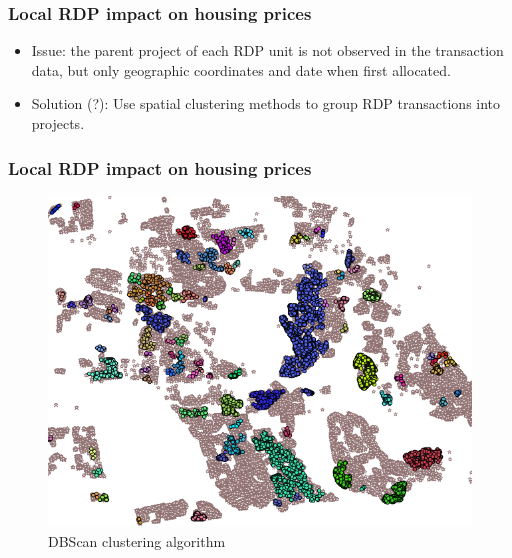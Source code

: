 \documentclass[aspectratio=149]{beamer}
\begin{document}

\begin{frame}
\frametitle{Local RDP impact on housing prices}

\begin{itemize}
  \item Issue: the parent project of each RDP unit is not observed in the transaction data, but only geographic coordinates and date when first allocated. 

  \item Solution (?): Use spatial clustering methods to group RDP transactions into projects. 
\end{itemize}


\end{frame}


\begin{frame}
\frametitle{Local RDP impact on housing prices}

\begin{center}
\begin{figure}
\includegraphics[scale=0.39]{hdbscan.png}
\vspace{-3mm}
\caption{DBScan clustering algorithm}
\end{figure}
\end{center}


\end{frame}

\end{document}
